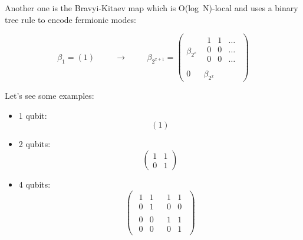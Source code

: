 Another one is the Bravyi-Kitaev \citep{bravyi2002fermionic} map which is O(log\ N)-local and uses a binary tree rule to encode fermionic modes:

\begin{equation*}
    \beta_1 = \left( 1 \right) \hspace{1cm} \rightarrow \hspace{1cm} 
    \beta_{2^{x+1}} = \left(
\begin{array}{c|c}
\beta_{2^x} &  \begin{array}{ccc}
     1 & 1 & \dots  \\
     0 & 0 & \dots  \\
     0 & 0 & \dots  \\
\end{array} \\
\hline
0 & \beta_{2^x}
\end{array}
\right)
\end{equation*}

Let's see some examples:

\begin{itemize}
    \item 1 qubit:
    \begin{equation*}
        \left( 1 \right)
    \end{equation*}
    \item 2 qubits:
    \begin{equation*}
        \left(
        \begin{array}{c|c}
        1 & 1 \\
        \hline
        0 & 1
        \end{array}
        \right)
    \end{equation*}
    \item 4 qubits:
    \begin{equation*}
        \left(
        \begin{array}{c|c}
        \begin{array}{cc}
        1 & 1 \\
        0 & 1
        \end{array} & \begin{array}{cc}
        1 & 1 \\
        0 & 0
        \end{array} \\
        \hline
        \begin{array}{cc}
        0 & 0 \\
        0 & 0
        \end{array} & \begin{array}{cc}
        1 & 1 \\
        0 & 1
        \end{array}
        \end{array}
        \right)
    \end{equation*}
\end{itemize}

